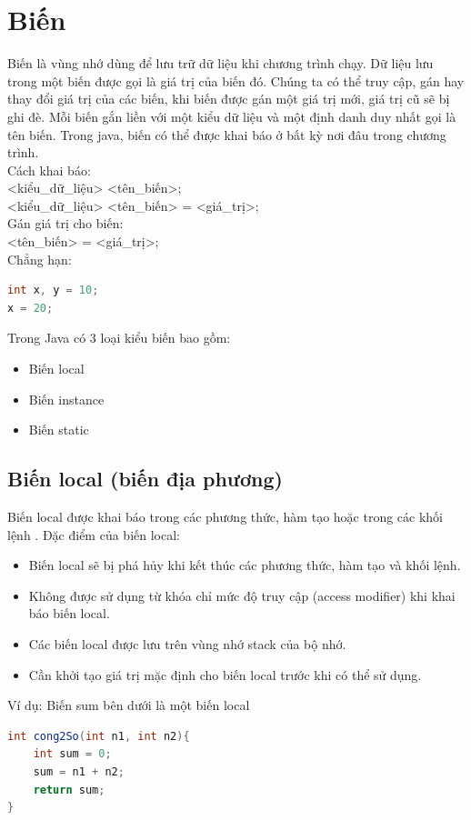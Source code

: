 \section{Biến}
\indent Biến là vùng nhớ dùng để lưu trữ dữ liệu khi chương trình chạy. Dữ liệu lưu trong một biến được gọi là giá trị của biến đó. Chúng ta có thể truy cập, gán hay thay đổi giá trị của các biến, khi biến được gán một giá trị mới, giá trị cũ sẽ bị ghi đè. Mỗi biến gắn liền với một kiểu dữ liệu và một định danh duy nhất gọi là tên biến. Trong java, biến có thể được khai báo ở bất kỳ nơi đâu trong chương trình.\\
\indent Cách khai báo:\\
{\ttfamily <kiểu\_dữ\_liệu> <tên\_biến>;\\
<kiểu\_dữ\_liệu> <tên\_biến> = <giá\_trị>;}\\
\indent Gán giá trị cho biến:\\
{\ttfamily <tên\_biến> = <giá\_trị>;}\\
\indent Chẳng hạn:
\begin{lstlisting}[escapechar=',language=java]	
int x, y = 10;
x = 20;
\end{lstlisting}
\indent Trong Java có 3 loại kiểu biến bao gồm:
\begin{itemize}
\item Biến local
\item Biến instance
\item Biến static
\end{itemize}
\subsection{Biến local (biến địa phương)}
\indent Biến local được khai báo trong các phương thức, hàm tạo hoặc trong các khối lệnh {}. Đặc điểm của biến local:
\begin{itemize}
\item Biến local sẽ bị phá hủy khi kết thúc các phương thức, hàm tạo và khối lệnh. 
\item Không được sử dụng từ khóa chỉ mức độ truy cập (access modifier) khi khai báo biến local. 
\item Các biến local được lưu trên vùng nhớ stack của bộ nhớ.
\item Cần khởi tạo giá trị mặc định cho biến local trước khi có thể sử dụng.
\end{itemize}
\indent Ví dụ: Biến sum bên dưới là một biến local
\begin{lstlisting}[escapechar=!,language=java]	
int cong2So(int n1, int n2){
	int sum = 0;
	sum = n1 + n2;
	return sum;
}
\end{lstlisting}
